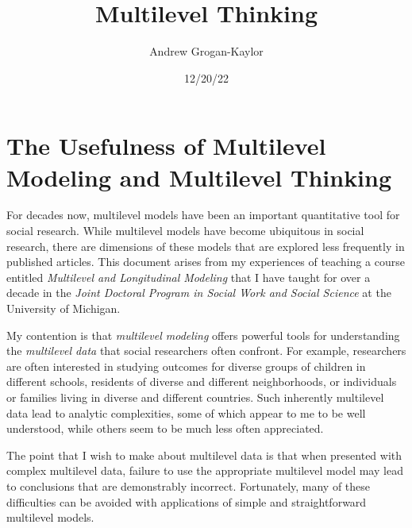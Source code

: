 \documentclass[
  letterpaper,
  DIV=11,
  numbers=noendperiod]{scrreprt}
\title{Multilevel Thinking}
\author{Andrew Grogan-Kaylor}
\date{12/20/22}
\renewcommand*\contentsname{Table of contents}
\newcommand\contentsname{Table of contents}
\begin{document}
\maketitle
\ifdefined\Shaded\renewenvironment{Shaded}{\begin{tcolorbox}[boxrule=0pt, frame hidden, sharp corners, breakable, enhanced, interior hidden, borderline west={3pt}{0pt}{shadecolor}]}{\end{tcolorbox}}\fi

\renewcommand*\contentsname{Table of contents}
{
\hypersetup{linkcolor=}
\setcounter{tocdepth}{2}
\tableofcontents
}

\hypertarget{the-usefulness-of-multilevel-modeling-and-multilevel-thinking}{%
\chapter{The Usefulness of Multilevel Modeling and Multilevel
Thinking}\label{the-usefulness-of-multilevel-modeling-and-multilevel-thinking}}

For decades now, multilevel models have been an important quantitative
tool for social research. While multilevel models have become ubiquitous
in social research, there are dimensions of these models that are
explored less frequently in published articles. This document arises
from my experiences of teaching a course entitled \emph{Multilevel and
Longitudinal Modeling} that I have taught for over a decade in the
\emph{Joint Doctoral Program in Social Work and Social Science} at the
University of Michigan.

My contention is that \emph{multilevel modeling} offers powerful tools
for understanding the \emph{multilevel data} that social researchers
often confront. For example, researchers are often interested in
studying outcomes for diverse groups of children in different schools,
residents of diverse and different neighborhoods, or individuals or
families living in diverse and different countries. Such inherently
multilevel data lead to analytic complexities, some of which appear to
me to be well understood, while others seem to be much less often
appreciated.

The point that I wish to make about multilevel data is that when
presented with complex multilevel data, failure to use the appropriate
multilevel model may lead to conclusions that are demonstrably
incorrect. Fortunately, many of these difficulties can be avoided with
applications of simple and straightforward multilevel models.
\end{document}
